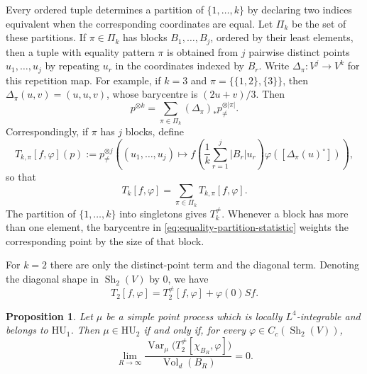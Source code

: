 \documentclass[11pt,reqno,a4paper]{amsart}
\numberwithin{equation}{section}
\theoremstyle{compact}
\newtheorem{proposition}[proposition]{Proposition}
\theoremstyle{definition}
\theoremstyle{definition}
\newcommand{\HU}{\mathrm{HU}}
\newcommand{\Var}{\operatorname{Var}}
\newcommand{\Vol}{\operatorname{Vol}}
\newcommand{\Sh}{\operatorname{Sh}}
\begin{document}
Every ordered tuple determines a partition of $\{1,\ldots,k\}$ by declaring
two indices equivalent when the corresponding coordinates are equal.  Let
$\Pi_k$ be the set of these partitions.  If $\pi\in\Pi_k$ has blocks
$B_1,\ldots,B_j$, ordered by their least elements, then a tuple with equality
pattern $\pi$ is obtained from $j$ pairwise distinct points
$u_1,\ldots,u_j$ by repeating $u_r$ in the coordinates indexed by $B_r$.
Write $\Delta_\pi:V^j\to V^k$ for this repetition map.  For example, if $k=3$ and $\pi=\{\{1,2\},\{3\}\}$, then
$\Delta_\pi(u,v)=(u,u,v)$, whose barycentre is $(2u+v)/3$.  Then
\begin{equation}\label{eq:full-factorial-partition}
  p^{\otimes k}
  =\sum_{\pi\in\Pi_k}(\Delta_\pi)_*
       p_{\neq}^{\otimes |\pi|}.
\end{equation}
Correspondingly, if $\pi$ has $j$ blocks, define
\begin{equation}\label{eq:equality-partition-statistic}
  T_{k,\pi}[f,\varphi](p)
  :=p_{\neq}^{\otimes j}\!\left(
       (u_1,\ldots,u_j)\mapsto
       f\!\left(\frac1k\sum_{r=1}^j|B_r|u_r\right)
       \varphi\!\left([\Delta_\pi(u)^\circ]\right)
     \right),
\end{equation}
so that
\begin{equation}\label{eq:full-as-equality-partitions}
  T_k[f,\varphi]=\sum_{\pi\in\Pi_k}T_{k,\pi}[f,\varphi].
\end{equation}
The partition of $\{1,\ldots,k\}$ into singletons gives
$T_k^{\neq}$.  Whenever a block has more than one element, the barycentre in
\eqref{eq:equality-partition-statistic} weights the corresponding point by
the size of that block.

For $k=2$ there are only the distinct-point term and the diagonal term.
Denoting the diagonal shape in $\Sh_2(V)$ by $0$, we have
\begin{equation}\label{eq:full-factorial-pair-identity}
  T_2[f,\varphi]
  =T_2^{\neq}[f,\varphi]+\varphi(0)Sf.
\end{equation}

\begin{proposition}\label{prop:full-factorial-pair-hu}
Let $\mu$ be a simple point process which is locally $L^4$-integrable and
belongs to $\HU_1$.  Then $\mu\in\HU_2$ if and only if, for every
$\varphi\in C_c(\Sh_2(V))$,
\begin{equation}\label{eq:factorial-pair-hu}
  \lim_{R\to\infty}
  \frac{\Var_\mu\big(T_2^{\neq}[\chi_{B_R},\varphi]\big)}
       {\Vol_d(B_R)}=0.
\end{equation}
\end{proposition}
\end{document}
